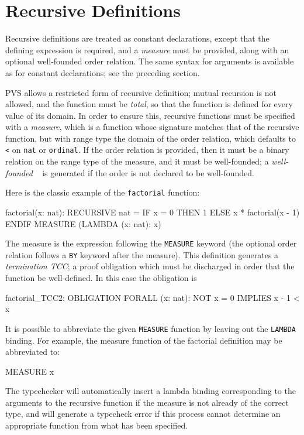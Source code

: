 
\section{Recursive Definitions}\label{recursive-definitions}

Recursive definitions are treated as constant declarations, except that
the defining expression is required, and a \emph{measure} must be provided, along with an optional well-founded order
relation. The same syntax for
arguments is available as for constant declarations; see the preceding
section.

PVS allows a restricted form of recursive definition; mutual
recursion is not allowed,
and the function must be \emph{total}, so that the
function is defined for every value of its domain.  In order to ensure
this, recursive functions must be specified with a
\emph{measure}, which is a function whose signature matches
that of the recursive function, but with range type the domain of the
order relation, which defaults to \texttt{<} on \texttt{nat} or
\texttt{ordinal}.  If the order
relation is provided, then it must be a binary relation on the range type
of the measure, and it must be well-founded; a \emph{well-founded} \tcc\
 is generated if the order
is not declared to be well-founded.

Here is the classic example of the
\texttt{factorial} function:
%
\begin{pvsex}
  factorial(x: nat): RECURSIVE nat =
    IF x = 0 THEN 1 ELSE x * factorial(x - 1) ENDIF
    MEASURE (LAMBDA (x: nat): x)
\end{pvsex}
%
The measure is the expression following the \texttt{MEASURE} keyword (the
optional order relation follows a \texttt{BY} keyword after the
measure).  This definition generates a \emph{termination
TCC}; a proof obligation
which must be discharged in order that the function be well-defined.  In
this case the obligation is
%
\begin{pvsex}
  factorial_TCC2: OBLIGATION
    FORALL (x: nat): NOT x = 0 IMPLIES x - 1 < x
\end{pvsex}

It is possible to abbreviate the given \texttt{MEASURE} function by
leaving out the \texttt{LAMBDA} binding.  For example, the measure
function of the factorial definition may be abbreviated to:
\begin{pvsex}
  MEASURE x
\end{pvsex}
The typechecker will automatically insert a lambda binding corresponding
to the arguments to the recursive function if the measure is not already
of the correct type, and will generate a typecheck error if this process
cannot determine an appropriate function from what has been specified.


